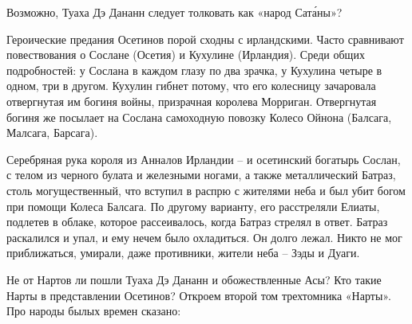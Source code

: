 
Возможно, Туаха Дэ Дананн следует толковать как «народ Сат\'аны»?

Героические предания Осетинов порой сходны с ирландскими. Часто сравнивают повествования о Сослане (Осетия) и Кухулине (Ирландия). Среди общих подробностей: у Сослана в каждом глазу по два зрачка, у Кухулина четыре в одном, три в другом. Кухулин гибнет потому, что его колесницу зачаровала отвергнутая им богиня войны, призрачная королева Морриган. Отвергнутая богиня же посылает на Сослана самоходную повозку Колесо Ойнона (Балсага, Малсага, Барсага). 

Серебряная рука короля из Анналов Ирландии – и осетинский богатырь Сослан, с телом из черного булата и железными ногами, а также металлический Батраз, столь могущественный, что вступил в распрю с жителями неба и был убит богом при помощи Колеса Балсага. По другому варианту, его расстреляли Елиаты, подлетев в облаке, которое рассеивалось, когда Батраз стрелял в ответ. Батраз раскалился и упал, и ему нечем было охладиться. Он долго лежал. Никто не мог приближаться, умирали, даже противники, жители неба – Зэды и Дуаги.

Не от Нартов ли пошли Туаха Дэ Дананн и обожествленные Асы? Кто такие Нарты в представлении Осетинов? Откроем второй том трехтомника «Нарты»\cite{narty01}. Про народы былых времен сказано:

